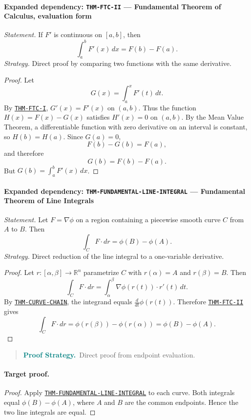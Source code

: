 \documentclass[10pt]{article}
\newcommand{\pidraw}[1]{\begingroup\urlstyle{tt}\nolinkurl{#1}\endgroup}
\newcommand{\pidref}[1]{\hyperref[prf:#1]{\pidraw{#1}}}
\newcommand{\pid}[1]{\pidref{#1}}
\theoremstyle{definition}
\theoremstyle{remark}
\newenvironment{proofstrategy}
{\begin{quote}\small\noindent\textbf{\textcolor{teal}{Proof Strategy.}}\ }
{\end{quote}}
\begin{document}
\paragraph{Expanded dependency: \pidraw{THM-FTC-II} --- Fundamental Theorem of Calculus, evaluation form}
\textit{Statement.} If $F'$ is continuous on $[a,b]$, then
\[
\int_a^b F'(x)\,dx=F(b)-F(a).
\]
\textit{Strategy.} Direct proof by comparing two functions with the same derivative.
\begin{proof}Let
\[
G(x)=\int_a^x F'(t)\,dt.
\]
By \pid{THM-FTC-I}, $G'(x)=F'(x)$ on $(a,b)$. Thus the function
$H(x)=F(x)-G(x)$ satisfies $H'(x)=0$ on $(a,b)$. By the Mean Value Theorem,
a differentiable function with zero derivative on an interval is constant, so
$H(b)=H(a)$. Since $G(a)=0$,
\[
F(b)-G(b)=F(a),
\]
and therefore
\[
G(b)=F(b)-F(a).
\]
But $G(b)=\int_a^b F'(x)\,dx$.\end{proof}

\paragraph{Expanded dependency: \pidraw{THM-FUNDAMENTAL-LINE-INTEGRAL} --- Fundamental Theorem of Line Integrals}
\textit{Statement.} Let $F=\nabla\phi$ on a region containing a piecewise smooth curve $C$ from $A$ to $B$. Then
\[
\int_C F\cdot dr=\phi(B)-\phi(A).
\]
\textit{Strategy.} Direct reduction of the line integral to a one-variable derivative.
\begin{proof}Let $r:[\alpha,\beta]\to\mathbb{R}^n$ parametrize $C$ with
$r(\alpha)=A$ and $r(\beta)=B$. Then
\[
\int_C F\cdot dr
=
\int_\alpha^\beta \nabla\phi(r(t))\cdot r'(t)\,dt.
\]
By \pid{THM-CURVE-CHAIN}, the integrand equals
$\frac{d}{dt}\phi(r(t))$. Therefore \pid{THM-FTC-II} gives
\[
\int_C F\cdot dr
=
\phi(r(\beta))-\phi(r(\alpha))
=
\phi(B)-\phi(A).
\]\end{proof}

\begin{proofstrategy}Direct proof from endpoint evaluation.\end{proofstrategy}

\paragraph{Target proof.}

\begin{proof}

Apply \pid{THM-FUNDAMENTAL-LINE-INTEGRAL} to each curve. Both integrals equal
$\phi(B)-\phi(A)$, where $A$ and $B$ are the common endpoints. Hence the two
line integrals are equal.

\end{proof}
\end{document}
